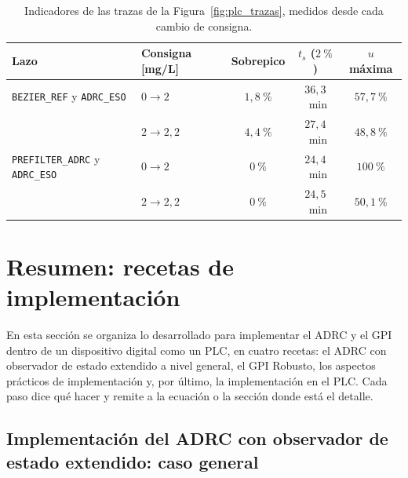 \begin{table}[H]
\centering
\caption[Indicadores de las trazas del PLC]{Indicadores de las trazas de la
  Figura~\ref{fig:plc_trazas}, medidos desde cada cambio de consigna.}
\label{tab:plc_trazas}
\renewcommand{\arraystretch}{1.2}
\begin{tabular}{llccc}
\toprule
\textbf{Lazo} & \textbf{Consigna [mg/L]} & \textbf{Sobrepico} & \textbf{$t_s$ ($2~\%$)} & \textbf{$u$ máxima} \\
\midrule
\texttt{BEZIER\_REF} y \texttt{ADRC\_ESO} & $0 \to 2$ & $1{,}8~\%$ & $36{,}3$~min & $57{,}7~\%$ \\
 & $2 \to 2{,}2$ & $4{,}4~\%$ & $27{,}4$~min & $48{,}8~\%$ \\
\addlinespace
\texttt{PREFILTER\_ADRC} y \texttt{ADRC\_ESO} & $0 \to 2$ & $0~\%$ & $24{,}4$~min & $100~\%$ \\
 & $2 \to 2{,}2$ & $0~\%$ & $24{,}5$~min & $50{,}1~\%$ \\
\bottomrule
\end{tabular}
\end{table}



\section{Resumen: recetas de implementación}
\label{sec:impl_resumen}

En esta sección se organiza lo desarrollado para implementar el ADRC y el GPI dentro de un dispositivo
digital como un PLC, en cuatro recetas: el ADRC con observador de estado extendido a nivel general, el
GPI Robusto, los aspectos prácticos de implementación y, por último, la implementación en el PLC. Cada paso
dice qué hacer y remite a la ecuación o la sección donde está el detalle.

\subsection{Implementación del ADRC con observador de estado extendido: caso general}

